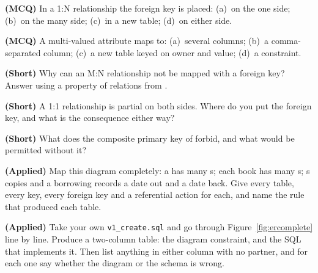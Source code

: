 \begin{reviewq}
  \item \textbf{(MCQ)} In a 1:N relationship the foreign key is placed:
        (a)~on the one side; (b)~on the many side; (c)~in a new table;
        (d)~on either side.
  \item \textbf{(MCQ)} A multi-valued attribute maps to: (a)~several columns;
        (b)~a comma-separated column; (c)~a new table keyed on owner and
        value; (d)~a  constraint.
  \item \textbf{(Short)} Why can an M:N relationship not be mapped with a
        foreign key? Answer using a property of relations from
        .
  \item \textbf{(Short)} A 1:1 relationship is partial on both sides. Where do
        you put the foreign key, and what is the consequence either way?
  \item \textbf{(Short)} What does the composite primary key of
         forbid, and what would be permitted without it?
  \item \textbf{(Applied)} Map this diagram completely: a  has
        many s; each book has many s; s
         copies and a borrowing records a date out and a date
        back. Give every table, every key, every foreign key and a referential
        action for each, and name the rule that produced each table.
  \item \textbf{(Applied)} Take your own \texttt{v1\_create.sql} and go through
        Figure~\ref{fig:ercomplete} line by line. Produce a two-column table:
        the diagram constraint, and the SQL that implements it. Then list
        anything in either column with no partner, and for each one say
        whether the diagram or the schema is wrong.
\end{reviewq}
